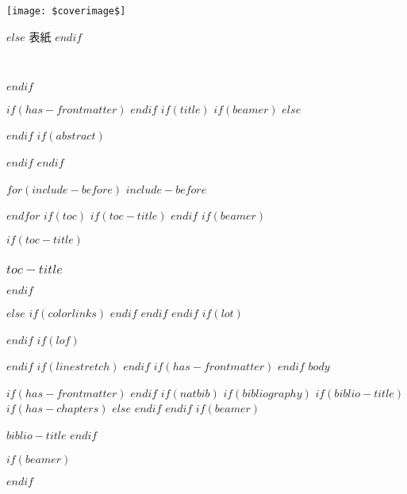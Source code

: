 \enlargethispage{\paperwidth}
\thispagestyle{empty}
\vspace*{-1truein}
\vspace*{-\topmargin}
\vspace*{-\headheight}
\vspace*{-\headsep}
\vspace*{-\topskip}
\noindent\hspace*{-1in}\hspace*{-\oddsidemargin}
\texttt{[image: \$coverimage\$]}

$else$
表紙
$endif$

\clearpage
\clearpage

$endif$


$if(has-frontmatter)$
\frontmatter
$endif$
$if(title)$
$if(beamer)$
\frame{\titlepage}
$else$
\maketitle
$endif$
$if(abstract)$
\begin{abstract}
$abstract$
\end{abstract}
$endif$
$endif$

\clearpage  %

\pagestyle{headings}

$for(include-before)$
$include-before$

$endfor$
$if(toc)$
$if(toc-title)$
\renewcommand*\contentsname{$toc-title$}
$endif$
$if(beamer)$
\begin{frame}
$if(toc-title)$
  \frametitle{$toc-title$}
$endif$
  \tableofcontents[hideallsubsections]
\end{frame}
$else$
{
$if(colorlinks)$
\hypersetup{linkcolor=$if(toccolor)$$toccolor$$else$$endif$}
$endif$
\setcounter{tocdepth}{$toc-depth$}
\tableofcontents
}
$endif$
$endif$
$if(lot)$
\listoftables
$endif$
$if(lof)$
\listoffigures
$endif$
$if(linestretch)$
$endif$
$if(has-frontmatter)$
\mainmatter
$endif$
$body$

$if(has-frontmatter)$
\backmatter
$endif$
$if(natbib)$
$if(bibliography)$
$if(biblio-title)$
$if(has-chapters)$
\renewcommand\bibname{$biblio-title$}
$else$
\renewcommand\refname{$biblio-title$}
$endif$
$endif$
$if(beamer)$
\begin{frame}[allowframebreaks]{$biblio-title$}
  \bibliographytrue
$endif$
  
$if(beamer)$
\end{frame}
$endif$

